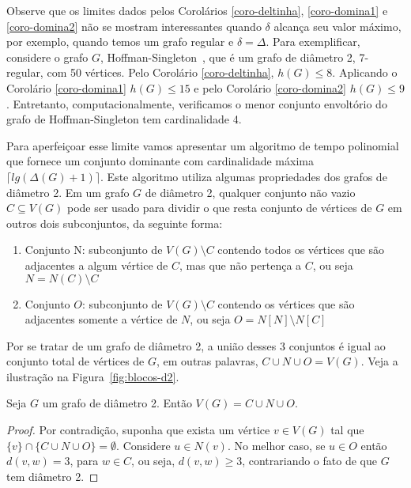 Observe que os limites dados pelos Corolários \ref{coro-deltinha}, \ref{coro-domina1} e \ref{coro-domina2} não se mostram interessantes quando $\delta$ alcança seu valor máximo, por exemplo, quando temos um grafo regular e $\delta=\Delta$. Para exemplificar, considere o grafo $G$, Hoffman-Singleton~\cite{Hoffman1960}, que é um grafo de diâmetro 2, 7-regular, com 50 vértices. Pelo Corolário \ref{coro-deltinha}, $h(G)\leq 8$. Aplicando o Corolário \ref{coro-domina1} $h(G) \leq 15$ e pelo Corolário \ref{coro-domina2} $h(G) \leq 9$. Entretanto, computacionalmente, verificamos o menor conjunto envoltório do grafo de Hoffman-Singleton tem cardinalidade 4.  

Para aperfeiçoar esse limite vamos apresentar um algoritmo de tempo polinomial que fornece um conjunto dominante com cardinalidade máxima $\lceil lg (\Delta(G)+1) \rceil$. Este algoritmo utiliza algumas propriedades dos grafos de diâmetro 2. Em um grafo $G$ de diâmetro 2, qualquer conjunto não vazio $C\subseteq V(G)$ pode ser usado para dividir o que resta conjunto de vértices de $G$ em outros dois subconjuntos, da seguinte forma:
\begin{enumerate}
\item {Conjunto N: subconjunto de $V(G)\setminus C$ contendo todos os vértices que são adjacentes a algum vértice de $C$, mas que não pertença a $C$, ou seja $N=N(C)\setminus C$}
\item {Conjunto $O$: subconjunto de $V(G)\setminus C$ contendo os vértices que são adjacentes somente a vértice de $N$, ou seja $O= N[N] \setminus N[C]$}
\end{enumerate}



Por se tratar de um grafo de diâmetro 2, a união desses 3 conjuntos é igual ao conjunto total de vértices de $G$, em outras palavras, $C \cup N \cup O = V(G)$. Veja a ilustração na Figura~\ref{fig:blocos-d2}. 

\begin{proposition}\label{prop:CNO} Seja $G$ um grafo de diâmetro 2. Então $V(G)= C \cup N \cup O$.
\end{proposition}
\begin{proof}
Por contradição, suponha que exista um vértice $v \in V(G)$ tal que $\{v\} \cap \{ C \cup N \cup O \} = \emptyset$. Considere $u \in N(v)$. No melhor caso, se $u \in O$ então $d(v,w)=3$, para $w \in C$, ou seja, $d(v,w)\geq 3$, contrariando o fato de que $G$ tem diâmetro 2.
\end{proof}

